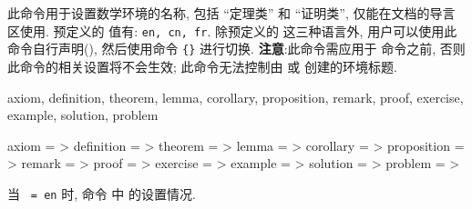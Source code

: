 \begin{function}[updated=2025-04-25]{\zthmnameset}
  \begin{syntax}
  \end{syntax}
  此命令用于设置数学环境的名称, 包括 ``定理类'' 和 ``证明类'', 仅能在文档的导言区使用. 预定义的  值有: \texttt{en, cn, fr}. 除预定义的
  这三种语言外, 用户可以使用此命令自行声明(), 然后使用命令 \texttt{\{\}} 进行切换.%
  \textbf{注意}:此命令需应用于  命令之前, 否则此命令的相关设置将不会生效; 此命令无法控制由 \cmd{\zthmenvnew} 
  或 \cmd{\zthmenvset} 创建的环境标题.
\end{function} 

\vspace{2em}
\noindent{}

\begin{keyval}[parent=zthmnameset]{
    axiom, definition, theorem, lemma, corollary, proposition, remark,
    proof, exercise, example, solution, problem
  }
  \begin{syntax}
    axiom       = >
    definition  = >
    theorem     = >
    lemma       = >
    corollary   = >
    proposition = >
    remark      = >
    proof       = >
    exercise    = >
    example     = >
    solution    = >
    problem     = >
  \end{syntax}
  当 \texttt{ = en} 时, 命令  中  的设置情况.
\end{keyval}

